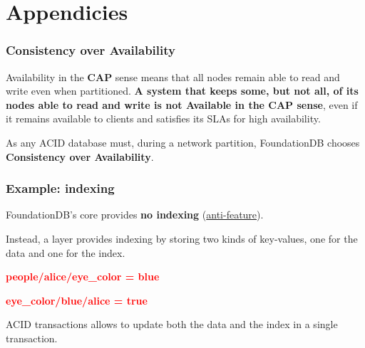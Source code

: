 \section{Appendicies}


\begin{frame}
	\frametitle{Consistency over Availability}

 Availability in the \textbf{CAP} sense means that all nodes remain able to read and write even 
 when partitioned. \textbf{A system that keeps some, but not all, of its nodes able to read and write is 
 not Available in the CAP sense}, even if it remains available to clients and satisfies its SLAs 
 for high availability.
\vspace{0.5cm}

As any ACID database must, during a network partition, FoundationDB chooses \textbf{Consistency over Availability}. 

\end{frame}


\begin{frame}
	\frametitle{Example: indexing}

FoundationDB’s core provides \textbf{no indexing}  (\href{https://apple.github.io/foundationdb/anti-features.html}{anti-feature}).

Instead, a layer provides indexing by storing two kinds of key-values, one for the data and one for the index.

\begin{center}
\textbf{\textcolor{red}{people/alice/eye\_color = blue}}
\end{center}

\begin{center}
\textbf{\textcolor{red}{eye\_color/blue/alice = true}}
\end{center}

ACID transactions allows to update both the data and the index in a single transaction.
\end{frame}



